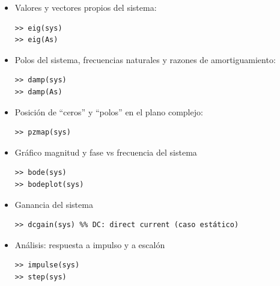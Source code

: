 \begin{itemize}
    \item Valores y vectores propios del sistema:
\begin{verbatim}
>> eig(sys)
>> eig(As)
\end{verbatim}
\item Polos del sistema, frecuencias naturales y razones de amortiguamiento:
\begin{verbatim}
>> damp(sys)
>> damp(As)
\end{verbatim}
\item Posición de ``ceros'' y ``polos'' en el plano complejo:
\begin{verbatim}
>> pzmap(sys)
\end{verbatim}
\item Gráfico magnitud y fase vs frecuencia del sistema
\begin{verbatim}
>> bode(sys)
>> bodeplot(sys)
\end{verbatim}
\item Ganancia del sistema
\begin{verbatim}
>> dcgain(sys) %% DC: direct current (caso estático)
\end{verbatim}

\item Análisis: respuesta a impulso y a escalón
\begin{verbatim}
>> impulse(sys)
>> step(sys)
\end{verbatim}
\end{itemize}









